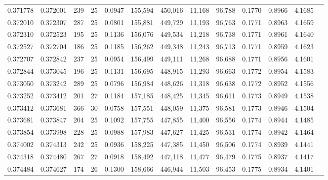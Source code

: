 \begin{tabular}{rrrrrrrrrrrrr}
0.371778 & 0.372001 & 239 &  25 &                                     0.0947 & 155,594 & 450,016 &  11,168 &  96,788 & 0.1770 & 0.8966 & 4.1685 \\
0.372010 & 0.372307 & 287 &  25 &                                     0.0801 & 155,881 & 449,729 &  11,193 &  96,763 & 0.1771 & 0.8963 & 4.1659 \\
0.372310 & 0.372523 & 195 &  25 &                                     0.1136 & 156,076 & 449,534 &  11,218 &  96,738 & 0.1771 & 0.8961 & 4.1640 \\
0.372527 & 0.372704 & 186 &  25 &                                     0.1185 & 156,262 & 449,348 &  11,243 &  96,713 & 0.1771 & 0.8959 & 4.1623 \\
0.372707 & 0.372842 & 237 &  25 &                                     0.0954 & 156,499 & 449,111 &  11,268 &  96,688 & 0.1771 & 0.8956 & 4.1601 \\
0.372844 & 0.373045 & 196 &  25 &                                     0.1131 & 156,695 & 448,915 &  11,293 &  96,663 & 0.1772 & 0.8954 & 4.1583 \\
0.373050 & 0.373242 & 289 &  25 &                                     0.0796 & 156,984 & 448,626 &  11,318 &  96,638 & 0.1772 & 0.8952 & 4.1556 \\
0.373252 & 0.373412 & 201 &  27 &                                     0.1184 & 157,185 & 448,425 &  11,345 &  96,611 & 0.1773 & 0.8949 & 4.1538 \\
0.373412 & 0.373681 & 366 &  30 &                                     0.0758 & 157,551 & 448,059 &  11,375 &  96,581 & 0.1773 & 0.8946 & 4.1504 \\
0.373681 & 0.373847 & 204 &  25 &                                     0.1092 & 157,755 & 447,855 &  11,400 &  96,556 & 0.1774 & 0.8944 & 4.1485 \\
0.373854 & 0.373998 & 228 &  25 &                                     0.0988 & 157,983 & 447,627 &  11,425 &  96,531 & 0.1774 & 0.8942 & 4.1464 \\
0.374002 & 0.374313 & 242 &  25 &                                     0.0936 & 158,225 & 447,385 &  11,450 &  96,506 & 0.1774 & 0.8939 & 4.1441 \\
0.374318 & 0.374480 & 267 &  27 &                                     0.0918 & 158,492 & 447,118 &  11,477 &  96,479 & 0.1775 & 0.8937 & 4.1417 \\
0.374484 & 0.374627 & 174 &  26 &                                     0.1300 & 158,666 & 446,944 &  11,503 &  96,453 & 0.1775 & 0.8934 & 4.1401 \\

\end{tabular}
